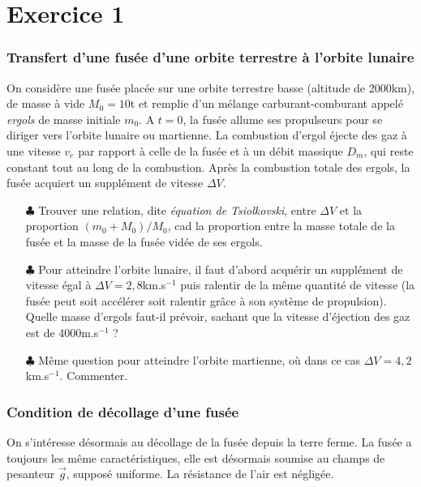 \documentclass{report}
\begin{document}
\section*{Exercice 1}

\subsubsection*{Transfert d'une fusée d'une orbite terrestre à l'orbite lunaire}

On considère une fusée placée sur une orbite terrestre basse (altitude de 2000km), de masse à vide $M_0=10$t et remplie d'un mélange carburant-comburant appelé \textit{ergols} de masse initiale $m_0$. A $t=0$, la fusée allume ses propulseurs pour se diriger vers l'orbite lunaire ou martienne. La combustion d'ergol éjecte des gaz à une vitesse $v_e$ par rapport à celle de la fusée et à un débit massique $D_m$, qui reste constant tout au long de la combustion. Après la combustion totale des ergols, la fusée acquiert un supplément de vitesse $\Delta V$.

\begin{itemize}

	\item[$\clubsuit$] Trouver une relation, dite \textit{équation de Tsiolkovski}, entre $\Delta V$ et la proportion $(m_0+M_0)/M_0$, cad la proportion entre la masse totale de la fusée et la masse de la fusée vidée de ses ergols. 
	
	\item[$\clubsuit$] Pour atteindre l'orbite lunaire, il faut d'abord acquérir un supplément de vitesse égal à $\Delta V=2,8$km.s$^{-1}$ puis ralentir de la même quantité de vitesse (la fusée peut soit accélérer soit ralentir grâce à son système de propulsion). Quelle masse d'ergols faut-il prévoir, sachant que la vitesse d'éjection des gaz est de 4000m.s$^{-1}$ ?
	
	\item[$\clubsuit$] Même question pour atteindre l'orbite martienne, où dans ce cas $\Delta V=4,2$km.s$^{-1}$. Commenter. 
	
\end{itemize}

\subsubsection*{Condition de décollage d'une fusée}

On s'intéresse désormais au décollage de la fusée depuis la terre ferme. La fusée a toujours les même caractéristiques, elle est désormais soumise au champs de pesanteur $\vec{g}$, supposé uniforme. La résistance de l'air est négligée. 
\end{document}
